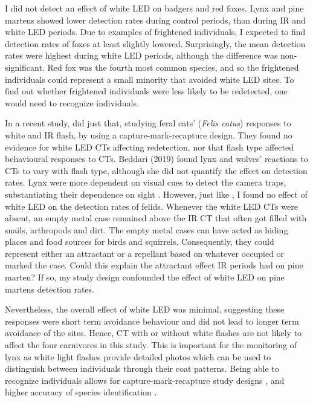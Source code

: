 I did not detect an effect of white LED on badgers and red foxes.
Lynx and pine martens showed lower detection rates during control periods, than during IR and white LED periods.
Due to examples of frightened individuals, I expected to find detection rates of foxes at least slightly lowered. Surprisingly, the mean detection rates were highest during white LED periods, although the difference was non-significant.
Red fox was the fourth most common species, and so the frightened individuals could represent a small minority that avoided white LED sites. To find out whether frightened individuals were less likely to be redetected, one would need to recognize individuals. %

In a recent study, \textcite{Taggart2020} did just that, studying feral cats' (\textit{Felis catus}) responses to white and IR flash, by using a capture-mark-recapture design.
They found no evidence for white LED CTs affecting redetection, nor that flash type affected behavioural responses to CTs.
Beddari (2019) found lynx and wolves' reactions to CTs to vary with flash type, although she did not quantify the effect on detection rates. Lynx were more dependent on visual cues to detect the camera traps, substantiating their dependence on sight \autocite{Beddari2019}. 
However, just like \textcite{Taggart2020}, I found no effect of white LED on the detection rates of felids. 
Whenever the white LED CTs were absent, an empty metal case remained above the IR CT that often got filled with snails, arthropods and dirt. The empty metal cases can have acted as hiding places and food sources for birds and squirrels. Consequently, they could represent either an attractant or a repellant based on whatever occupied or marked the case.
Could this explain the attractant effect IR periods had on pine marten? If so, my study design confounded the effect of white LED on pine martens detection rates.

Nevertheless, the overall effect of white LED was minimal, suggesting these responses were short term avoidance behaviour and did not lead to longer term avoidance of the sites.  
Hence, CT with or without white flashes are not likely to affect the four carnivores in this study.
This is important for the monitoring of lynx as white light flashes provide detailed photos which can be used to distinguish between individuals through their coat patterns.
Being able to recognize individuals allows for capture-mark-recapture study designs \autocite{Rovero2013}, and higher accuracy of species identification \autocite{Glen2013a}.


